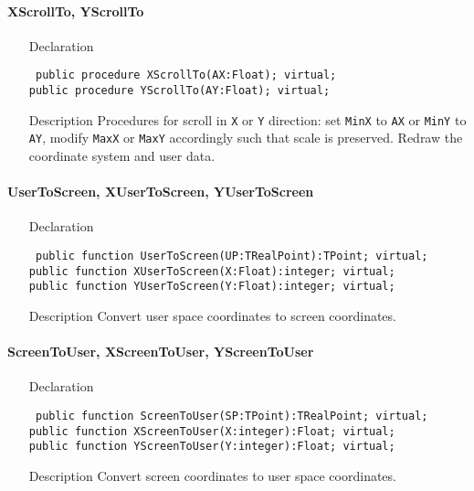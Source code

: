 \documentclass[12pt,a4paper,oneside]{report}
\newcommand{\declarationitem}[1]{{\addfontfeatures{FakeSlant} #1}}
\newcommand{\descriptiontitle}[1]{{\addfontfeatures{FakeSlant}#1}}
\newcommand{\code}[1]{\texttt{#1}}
\begin{document}
\paragraph{XScrollTo, YScrollTo}\hspace*{\fill}
\label{lmcoordsys.TCoordSys-XScrollTo}
\begin{itemize}\item[\declarationitem{Declaration}\hfill]
	\begin{flushleft}
		\code{
			public procedure XScrollTo(AX:Float); virtual;\\
			public procedure YScrollTo(AY:Float); virtual;}
	\end{flushleft}
	\item[\descriptiontitle{Description}]
	Procedures for scroll in \code{X} or \code{Y} direction: set \code{MinX} to \code{AX} or \code{MinY} to \code{AY}, modify \code{MaxX} or \code{MaxY} accordingly such that scale is preserved. Redraw the coordinate system and user data.
\end{itemize}
\paragraph{UserToScreen, XUserToScreen, YUserToScreen}\hspace*{\fill}
\label{lmcoordsys.TCoordSys-UserToScreen}
\begin{itemize}\item[\declarationitem{Declaration}\hfill]
	\begin{flushleft}
		\code{
			public function UserToScreen(UP:TRealPoint):TPoint; virtual;\\
			public function XUserToScreen(X:Float):integer; virtual;\\
			public function YUserToScreen(Y:Float):integer; virtual;}
	\end{flushleft}
	\item[\descriptiontitle{Description}]
	Convert user space coordinates to screen coordinates.
\end{itemize}

\paragraph{ScreenToUser, XScreenToUser, YScreenToUser}\hspace*{\fill}
\label{lmcoordsys.TCoordSys-XScreenToUser}
\begin{itemize}\item[\declarationitem{Declaration}\hfill]
	\begin{flushleft}
		\code{
			public function ScreenToUser(SP:TPoint):TRealPoint; virtual;\\
			public function XScreenToUser(X:integer):Float; virtual;\\
			public function YScreenToUser(Y:integer):Float; virtual;}
	\end{flushleft}
	\item[\descriptiontitle{Description}]
	Convert screen coordinates to user space coordinates.
\end{itemize}
\end{document}
